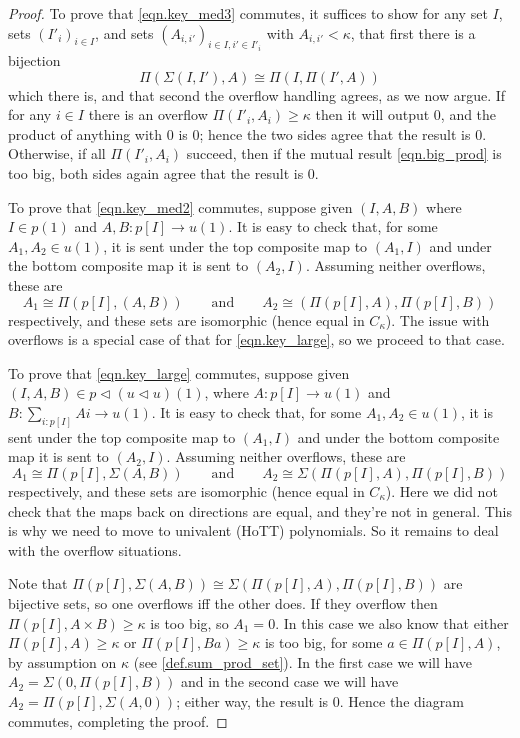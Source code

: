 \documentclass[11pt, one side, article]{memoir}
\theoremstyle{definition}
\theoremstyle{plain}
\newcommand{\0}{\textsf{0}}
\newcommand{\1}{\tn{\textsf{1}}}
\newcommand{\tri}{\mathbin{\triangleleft}}
\newcommand{\qqand}{\qquad\text{and}\qquad}
\begin{document}
\begin{proof}
To prove that \eqref{eqn.key_med3} commutes, it suffices to show for any set $I$, sets $(I'_i)_{i\in I}$, and sets $(A_{i,i'})_{i\in I, i'\in I'_i}$ with $A_{i,i'}<\kappa$, that first there is a bijection
\begin{equation}\label{eqn.big_prod}
\Pi(\Sigma(I,I'),A)\cong\Pi(I,\Pi(I',A))
\end{equation}
which there is, and that second the overflow handling agrees, as we now argue. If for any $i\in I$ there is an overflow $\Pi(I'_i,A_i)\geq\kappa$ then it will output $0$, and the product of anything with $0$ is $0$; hence the two sides agree that the result is $0$. Otherwise, if all $\Pi(I'_i,A_i)$ succeed, then if the mutual result \eqref{eqn.big_prod} is too big, both sides again agree that the result is $0$.

To prove that \eqref{eqn.key_med2} commutes, suppose given $(I,A,B)$ where $I\in p(1)$ and $A,B\colon p[I]\to u(1)$. It is easy to check that, for some $A_1,A_2\in u(1)$, it is sent under the top composite map to  $(A_1,I)$ and under the bottom composite map it is sent to $(A_2,I)$. Assuming neither overflows, these are
\[
  A_1\cong\Pi(p[I],(A, B))
  \qqand
	A_2\cong(\Pi(p[I],A),\Pi(p[I],B))
\] 
respectively, and these sets are isomorphic (hence equal in $C_\kappa$). The issue with overflows is a special case of that for \eqref{eqn.key_large}, so we proceed to that case.

To prove that \eqref{eqn.key_large} commutes, suppose given $(I,A,B)\in p\tri(u\tri u)(1)$, where $A\colon p[I]\to u(1)$ and $B\colon\sum_{i:p[I]}Ai\to u(1)$. It is easy to check that, for some $A_1,A_2\in u(1)$, it is sent under the top composite map to  $(A_1,I)$ and under the bottom composite map it is sent to $(A_2,I)$. Assuming neither overflows, these are 
\[
  A_1\cong\Pi(p[I],\Sigma(A, B))
  \qqand
	A_2\cong\Sigma(\Pi(p[I],A),\Pi(p[I],B))
\] 
respectively, and these sets are isomorphic (hence equal in $C_\kappa$). {\color{red!50!black} Here we did not check that the maps back on directions are equal, and they're not in general. This is why we need to move to univalent (HoTT) polynomials.} So it remains to deal with the overflow situations.

Note that $\Pi(p[I],\Sigma(A, B))\cong\Sigma(\Pi(p[I],A),\Pi(p[I],B))$ are bijective sets, so one overflows iff the other does. If they overflow then $\Pi(p[I],A\times B)\geq\kappa$ is too big, so $A_1=0$. In this case we also know that either $\Pi(p[I],A)\geq\kappa$ or $\Pi(p[I],Ba)\geq\kappa$ is too big, for some $a\in\Pi(p[I],A)$, by assumption on $\kappa$ (see \cref{def.sum_prod_set}). In the first case we will have $A_2=\Sigma(0,\Pi(p[I],B))$ and in the second case we will have $A_2=\Pi(p[I],\Sigma(A, 0))$; either way, the result is $0$. Hence the diagram commutes, completing the proof.
\end{proof}
\end{document}
